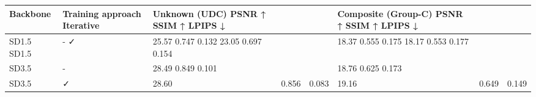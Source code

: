 \begin{tabular}{llllllll}
\toprule
Backbone & Training approach Iterative & Unknown (UDC) PSNR ↑ SSIM ↑ LPIPS ↓ &  &  & Composite (Group-C) PSNR ↑ SSIM ↑ LPIPS ↓ &  &  \\
\midrule
SD1.5 SD1.5 & - ✓ & 25.57 0.747 0.132 23.05 0.697 0.154 &  &  & 18.37 0.555 0.175 18.17 0.553 0.177 &  &  \\
SD3.5 & - & 28.49 0.849 0.101 &  &  & 18.76 0.625 0.173 &  &  \\
SD3.5 & ✓ & 28.60 & 0.856 & 0.083 & 19.16 & 0.649 & 0.149 \\
\bottomrule
\end{tabular}
